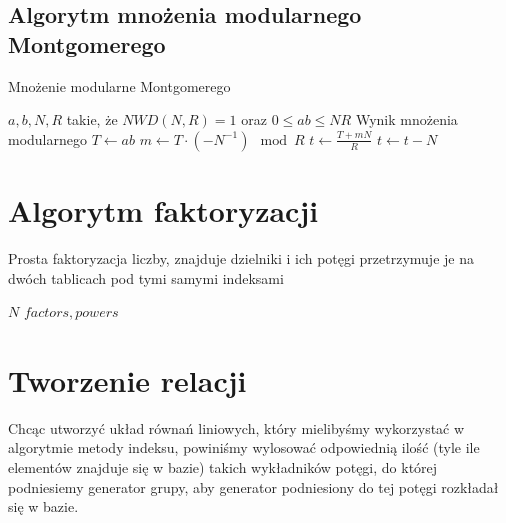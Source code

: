 \documentclass{article}
\begin{document}
\subsection{Algorytm mnożenia modularnego Montgomerego}
\begin{algorithm}[H]
\caption{Mnożenie modularne Montgomerego}
\renewcommand{\algorithmicrequire}{\textbf{Wejście:}}
\renewcommand{\algorithmicensure}{\textbf{Wyjście:}}
\begin{algorithmic}[1]
    \REQUIRE $a,b,N,R$ takie, że $NWD(N,R) = 1$ oraz $0 \leq ab \leq NR$
    \ENSURE  Wynik mnożenia modularnego
    \STATE $T \gets ab$
    \STATE $m \gets T \cdot (-N^{-1}) \mod R$
    \STATE $t\gets \frac{T+mN}{R}$
        \STATE $t \gets t - N$
        \ENDIF
\end{algorithmic}
\end{algorithm}



\section{Algorytm faktoryzacji}
Prosta faktoryzacja liczby, znajduje dzielniki i ich potęgi przetrzymuje je na dwóch tablicach pod tymi samymi indeksami
\begin{algorithm}[H]
\renewcommand{\algorithmicrequire}{\textbf{Wejście:}}
\renewcommand{\algorithmicensure}{\textbf{Wyjście:}}
\begin{algorithmic}[1]
    \REQUIRE $N$
    \ENSURE  $factors,powers$
        \ENDIF
    \ENDFOR
    \ENDIF
    \ENDIF
\ENDWHILE
{}
\end{algorithmic}
\end{algorithm}

\newpage

\section{Tworzenie relacji}\label{Algorytm tworzenia relacji}
Chcąc utworzyć układ równań liniowych, który mielibyśmy wykorzystać w algorytmie metody indeksu, powiniśmy wylosować odpowiednią ilość (tyle ile elementów znajduje się w bazie) takich wykładników potęgi, do której podniesiemy generator grupy, aby generator podniesiony do tej potęgi rozkładał się w bazie.
\end{document}
